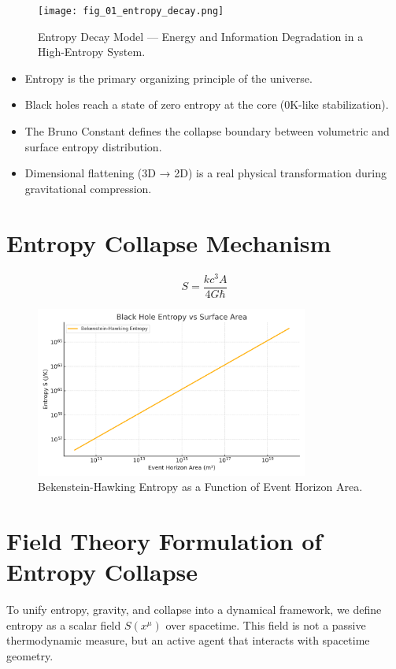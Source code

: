 \documentclass[12pt]{article}
\begin{document}
\begin{figure}[H]
    \centering
    \texttt{[image: fig\_01\_entropy\_decay.png]}
    \caption{Entropy Decay Model — Energy and Information Degradation in a High-Entropy System.}
    \label{fig:entropy_decay}
\end{figure}

\begin{itemize}
    \item Entropy is the primary organizing principle of the universe.
    \item Black holes reach a state of zero entropy at the core (0K-like stabilization).
    \item The Bruno Constant defines the collapse boundary between volumetric and surface entropy distribution.
    \item Dimensional flattening (3D → 2D) is a real physical transformation during gravitational compression.
\end{itemize}

\section{Entropy Collapse Mechanism}
\[ S = \frac{k c^3 A}{4 G \hbar} \]

\begin{figure}[H]
    \centering
    \includegraphics[width=0.8\textwidth]{fig_02_bh_entropy_area.png}
    \caption{Bekenstein-Hawking Entropy as a Function of Event Horizon Area.}
    \label{fig:bh_entropy_area}
\end{figure}

\clearpage
\section{Field Theory Formulation of Entropy Collapse}

To unify entropy, gravity, and collapse into a dynamical framework, we define entropy as a scalar field $S(x^\mu)$ over spacetime. This field is not a passive thermodynamic measure, but an active agent that interacts with spacetime geometry. 
\end{document}
